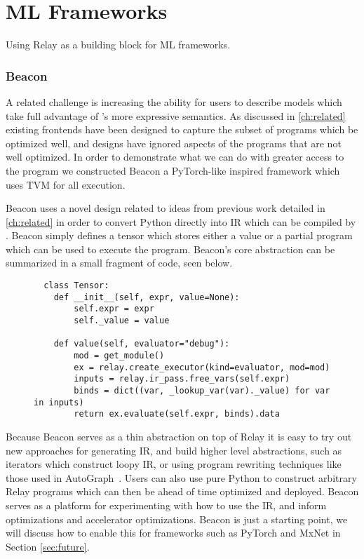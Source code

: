 \chapter{ML Frameworks}
\label{ch:frameworks}

Using Relay as a building block for ML frameworks.


\subsection{Beacon}

A related challenge is increasing the ability for users to describe models which take
  full advantage of \relay's more expressive semantics.
As discussed in \ref{ch:related} existing frontends have been designed to capture the
  subset of programs which be optimized well, and designs have ignored aspects of the
  programs that are not well optimized.
In order to demonstrate what we can do with greater access to the program we constructed
  Beacon a PyTorch-like inspired framework which uses TVM for all execution.

Beacon uses a novel design related to ideas from previous work detailed in \ref{ch:related}
  in order to convert Python directly into IR which can be compiled by \relay.
Beacon simply defines a tensor which stores either a value or a partial program
  which can be used to execute the program.
Beacon's core abstraction can be summarized in a small fragment of code, seen below.

\begin{figure}
\begin{verbatim}
  class Tensor:
    def __init__(self, expr, value=None):
        self.expr = expr
        self._value = value

    def value(self, evaluator="debug"):
        mod = get_module()
        ex = relay.create_executor(kind=evaluator, mod=mod)
        inputs = relay.ir_pass.free_vars(self.expr)
        binds = dict((var, _lookup_var(var)._value) for var in inputs)
        return ex.evaluate(self.expr, binds).data
\end{verbatim}
\end{figure}

Because Beacon serves as a thin abstraction on top of Relay it
  is easy to try out new approaches for generating IR, and build
  higher level abstractions, such as iterators which construct
  loopy IR, or using program rewriting techniques like those
  used in AutoGraph~\citep{AutoGraph}.
Users can also use pure Python to construct arbitrary Relay
  programs which can then be ahead of time optimized and
  deployed.
Beacon serves as a platform for experimenting with how
  to use the IR, and inform optimizations and accelerator optimizations.
Beacon is just a starting point, we will discuss how to enable this for frameworks
  such as PyTorch and MxNet in Section \ref{sec:future}.
